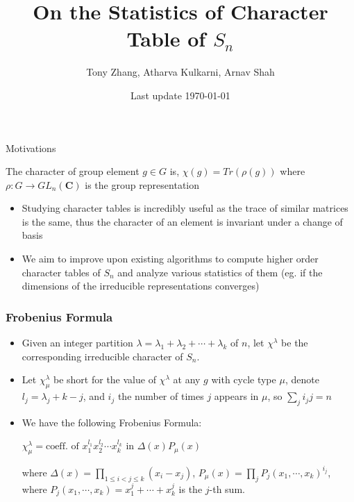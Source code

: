 \documentclass{beamer}
\title[University of Michigan LoG(M)]{On the Statistics of Character Table of $S_n$}
\author{Tony Zhang, Atharva Kulkarni, Arnav Shah}
\institute{University of Michigan}
\date{Last update \today}
\begin{document}
\begin{frame}
\titlepage
\end{frame}

\begin{frame}{Motivations}
    \begin{definition}
        The character of group element $g \in G$ is, $\chi(g) = Tr(\rho(g))$ where $\rho: G \rightarrow GL_n(\mathbf{C})$ is the group representation \cite{diaconis}
    \end{definition}
    \begin{itemize}
        \item Studying character tables is incredibly useful as the trace of similar matrices is the same, thus the character of an element is invariant under a change of basis
        \item We aim to improve upon existing algorithms to compute higher order character tables of $S_n$ and analyze various statistics of them (eg. if the dimensions of the irreducible representations converges) 
    \end{itemize}
\end{frame}
\begin{frame}
\frametitle{Frobenius Formula}
\begin{theorem} 
    \begin{itemize}
\item Given an integer partition $\lambda = \lambda_1 + \lambda_2 + \cdots + \lambda_k$ of $n$, let $\chi^{\lambda}$ be the corresponding irreducible character of $S_n$. 
\item Let $\chi^{\lambda}_{\mu}$ be short for the value of $\chi^{\lambda}$ at any $g$ with cycle type $\mu$, denote $l_j  =\lambda_j + k - j$, and $i_j$ the number of times $j$ appears in $\mu$, so $\sum\limits_j i_jj = n$
\item We have the following Frobenius Formula: 

 $\chi^{\lambda}_{\mu} = \text{coeff. of }  x_{1}^{l_1} x_{2}^{l_2}\cdots x_{k}^{l_k}$ in $\Delta(x) P_{\mu}(x)$
 
  
where $\Delta(x) = \prod\limits_{1 \leq i < j \leq k} (x_i-x_j)$, $P_\mu(x) = \prod\limits_j P_j(x_1,\cdots, x_k)^{i_j}$, where $P_j(x_1,\cdots, x_k) = x_1^j + \cdots + x_k^j$ is the $j$-th sum.
\end{itemize}
\end{theorem}
\end{frame}
\end{document}
